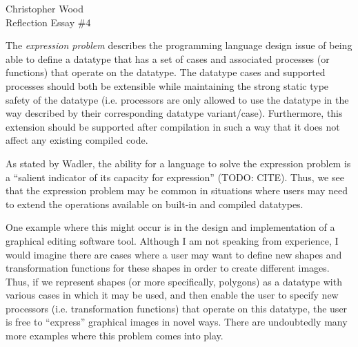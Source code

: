 \documentclass[12pt,letterpaper]{article}
\begin{document}
\begin{center}
Christopher Wood \\
Reflection Essay \#4 \\
\end{center}

\begin{comment}
What is the "expression problem"?
Can you suggest a realistic example of where one might encounter the expression problem is a software development project?
Is this a good "programming-languages problem"? That is, do you think that a programming language that has a "good" solution to the expression problem is "better" than a programming language that has a "bad" solution or no solution?
Can you suggest another "programming-languages problem"? That is, can you suggest a programming or software development task that you think would allow you to identify "good" (e.g., "powerful") languages from "bad" (e.g., "weak") languages.
\end{comment}

The \emph{expression problem} describes the programming language design issue of being able to define a 
datatype that has a set of cases and associated processes (or functions) that operate on the datatype.
The datatype cases and supported processes should both be extensible while maintaining the strong
static type safety of the datatype (i.e. processors are only allowed to use the datatype in the way
described by their corresponding datatype variant/case). Furthermore, this extension should be 
supported after compilation in such a way that it does not affect any existing compiled code. 

As stated by Wadler, the ability for a language to solve the expression problem is a ``salient
indicator of its capacity for expression'' (TODO: CITE). Thus, we see that the expression problem 
may be common in situations where users may need to extend the operations available on built-in 
and compiled datatypes. 

One example where this might occur is in the design and implementation of a graphical 
editing software tool. Although I am not speaking from experience, I would imagine there are cases where
a user may want to define new shapes and transformation functions for these shapes in order to create
different images. Thus, if we represent shapes (or more specifically, polygons) as a datatype 
with various cases in which it may be used, and then enable the user to specify new processors (i.e.
transformation functions) that operate on this datatype, the user is free to ``express'' graphical
images in novel ways. There are undoubtedly many more examples where this problem comes into play. 
\end{document}

